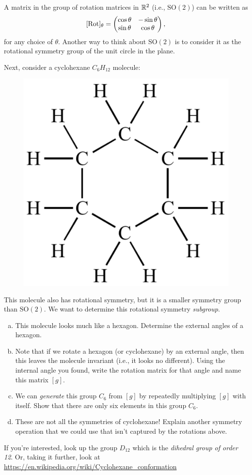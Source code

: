 \documentclass[12pt]{article} %
\begin{document}
\newpage
\begin{problem}
A matrix in the group of rotation matrices in $\mathbb{R}^2$ (i.e., $\mathrm{SO}(2)$) can be written as
\[
[\mathrm{Rot}]_\theta = \begin{pmatrix} \cos \theta & - \sin \theta \\ \sin \theta & \cos \theta \end{pmatrix},
\]
for any choice of $\theta$. Another way to think about $\mathrm{SO}(2)$ is to consider it as the rotational symmetry group of the unit circle in the plane.

Next, consider a cyclohexane $C_6H_{12}$ molecule:
    \begin{figure}[H]
        \centering
        \includegraphics[width=.3\textwidth]{Homework_10/cyclohexane-500x500.png}
    \end{figure}
    \noindent This molecule also has rotational symmetry, but it is a smaller symmetry group than $\mathrm{SO}(2)$. We want to determine this rotational symmetry \emph{subgroup}.
\begin{enumerate}[(a)]
    \item This molecule looks much like a hexagon. Determine the external angles of a hexagon.
    \item Note that if we rotate a hexagon (or cyclohexane) by an external angle, then this leaves the molecule invariant (i.e., it looks no different). Using the internal angle you found, write the rotation matrix for that angle and name this matrix $[g]$.
    \item We can \emph{generate} this group $C_6$ from $[g]$ by repeatedly multiplying $[g]$ with itself.  Show that there are only six elements in this group $C_6$.
    \item These are not all the symmetries of cyclohexane! Explain another symmetry operation that we could use that isn't captured by the rotations above.
\end{enumerate}
If you're interested, look up the group $D_{12}$ which is the \emph{dihedral group of order 12}. Or, taking it further, look at \url{https://en.wikipedia.org/wiki/Cyclohexane_conformation}
\end{problem}
\end{document}
